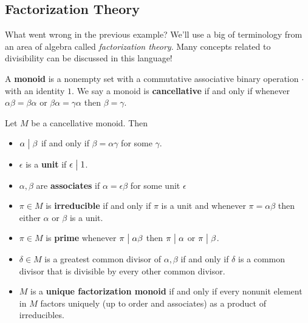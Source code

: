 \hypertarget{factorization-theory}{%
\subsection{Factorization Theory}\label{factorization-theory}}

\begin{remark}

What went wrong in the previous example? We'll use a big of terminology
from an area of algebra called \emph{factorization theory}. Many
concepts related to divisibility can be discussed in this language!

\end{remark}

\begin{definition}[Monoid]

A \textbf{monoid} is a nonempty set with a commutative associative
binary operation \(\cdot\) with an identity \(1\). We say a monoid is
\textbf{cancellative} if and only if whenever
\(\alpha \beta= \beta \alpha\) or \(\beta \alpha = \gamma \alpha\) then
\(\beta = \gamma\).

\end{definition}

\begin{definition}

Let \(M\) be a cancellative monoid. Then

\begin{itemize}
\item
  \(\alpha\bigm|\beta\) if and only if \(\beta= \alpha \gamma\) for some
  \(\gamma\).
\item
  \(\epsilon\) is a \textbf{unit} if \(\epsilon\bigm|1\).
\item
  \(\alpha , \beta\) are \textbf{associates} if
  \(\alpha = \epsilon \beta\) for some unit \(\epsilon\)
\item
  \(\pi\in M\) is \textbf{irreducible} if and only if \(\pi\) is a unit
  and whenever \(\pi= \alpha \beta\) then either \(\alpha\) or \(\beta\)
  is a unit.
\item
  \(\pi \in M\) is \textbf{prime} whenever \(\pi\bigm|\alpha \beta\)
  then \(\pi\bigm|\alpha\) or \(\pi\bigm|\beta\).
\item
  \(\delta \in M\) is a greatest common divisor of \(\alpha, \beta\) if
  and only if \(\delta\) is a common divisor that is divisible by every
  other common divisor.
\item
  \(M\) is a \textbf{unique factorization monoid} if and only if every
  nonunit element in \(M\) factors uniquely (up to order and associates)
  as a product of irreducibles.
\end{itemize}

\end{definition}

